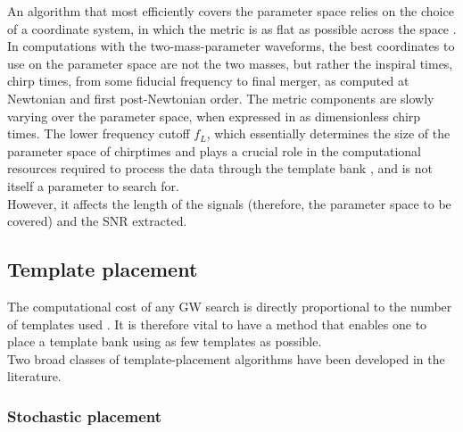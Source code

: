 \documentclass[binding=0.6cm, LaM]{sapthesis}
\begin{document}
	An algorithm that most efficiently covers the parameter space relies on the choice of a coordinate system, 
	in which the metric is as flat as possible across the space \cite{34}.
	In computations with the two-mass-parameter waveforms, 
	the best coordinates to use on the parameter space are not the two masses, 
	but rather the inspiral times, chirp times, from some fiducial frequency to final merger, 
	as computed at Newtonian and first post-Newtonian order. 
	The metric components are slowly varying over the parameter space, 
	when expressed in as dimensionless chirp times. 
        The lower frequency cutoff $f_L$, which essentially determines the size of the parameter space
        of chirptimes and plays a crucial role in the computational resources required
        to process the data through the template bank \cite{30}, and is not itself a parameter to search for. \\
        However, it affects the length of the signals
        (therefore, the parameter space to be covered) and the SNR extracted.

\subsection{Template placement}

	The computational cost of any GW search
	 is directly proportional to the number of templates used \cite{28}.
	It is therefore vital to have a method that enables one 
	to place a template bank using as few templates as possible. \\ 
	Two broad classes of template-placement algorithms 
	have been developed in the literature. 

\subsubsection{Stochastic placement}
\end{document}
